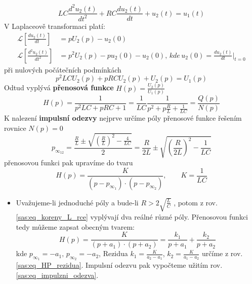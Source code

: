 \begin{example}
  \begin{equation}\label{sas:eq_dif_RLC_II_r}
    LC\frac{d^2u_2(t)}{dt^2}+RC\frac{du_2(t)}{dt}+u_2(t)=u_1(t)
  \end{equation}
  V Laplaceově transformaci platí:
  \begin{align*}
    \mathcal{L}\left[\frac{du_2(t)}{dt}\right]     &= pU_2(p)-u_2(0) \\
    \mathcal{L}\left[\frac{d^2u_2(t)}{dt^2}\right] &= p^2U_2(p)-pu_2(0)-u_2(0),\,kde\,u_2(0)=
    \frac{du_2(t)}{dt}|_{t=0}
  \end{align*}
  při nulových počátečních podmínkách
  \begin{equation}\label{sas:eq_L_RLC_rce}
    p^2LCU_2(p)+pRCU_2(p)+U_2(p)=U_1(p)
  \end{equation}
  Odtud vyplývá \textbf{přenosová funkce} $H(p)=\frac{U_2(p)}{U_1(p)}$
  \begin{equation}\label{sas:eq_Hp_RLC}
    H(p)=\frac{1}{p^2LC+pRC+1}
        =\frac{1}{LC}\frac{1}{p^2+p\frac{R}{L}+\frac{1}{LC}}=\frac{Q(p)}{N(p)}
  \end{equation}
  K nalezení \textbf{impulsní odezvy} nejprve určíme póly přenosové funkce řešením rovnice
  $N(p)=0$
  \begin{equation}\label{sas:eq_koreny_L_rce}
    p_{\infty_{12}}=\frac{\frac{R}{L}\pm\sqrt{\left(\frac{R}{L}\right)^2-\frac{4}{LC}}}{2}
    =\frac{R}{2L}\pm\sqrt{\left(\frac{R}{2L}\right)^2-\frac{1}{LC}}
  \end{equation}
  přenosovou funkci pak upravíme do tvaru
  \begin{equation}\label{sas:eq_Hp_forma}
    H(p)=\frac{K}{(p-p_{\infty_1})\cdot(p-p_{\infty_2})}, \qquad K=\frac{1}{LC}
  \end{equation}
  \begin{itemize}
    \item Uvažujeme-li jednoduché póly a bude-li $R>2\sqrt{\frac{L}{C}}$ , potom z  rov.
          \ref{sas:eq_koreny_L_rce} vyplývají dva reálné různé póly. Přenosovou funkci tedy můžeme
          zapsat obecným tvarem:
          \begin{equation}\label{sas:eq_Hp_forma_2}
            H(p)=\frac{K}{(p+a_1)\cdot(p+a_2)}=\frac{k_1}{p+a_1}+\frac{k_2}{p+a_2}
          \end{equation}
          kde $p_{\infty_1}=-a_1,\, p_{\infty_2}=-a_2$, Rezidua  $k_1=\frac{K}{a_2-a_1}$,
          $k_2=\frac{K}{a_1-a_2}$ určíme z rov. \ref{sas:eq_HP_rezidua}. Impulsní odezvu pak
          vypočteme užitím rov. \ref{sas:eq_impulzni_odezva}.
          \begin{equation}\label{sas:eq_ht1}

\end{equation}
\end{itemize}
\end{example}
